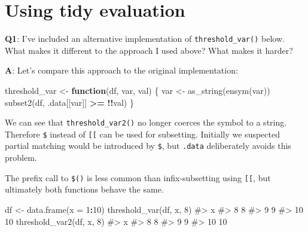 \documentclass[
]{krantz}
\makeatletter
\newenvironment{Shaded}{\begin{snugshade}}{\end{snugshade}}
\newcommand{\CommentTok}[1]{\textcolor[rgb]{0.56,0.35,0.01}{\textit{#1}}}
\newcommand{\ControlFlowTok}[1]{\textcolor[rgb]{0.13,0.29,0.53}{\textbf{#1}}}
\newcommand{\DataTypeTok}[1]{\textcolor[rgb]{0.13,0.29,0.53}{#1}}
\newcommand{\DecValTok}[1]{\textcolor[rgb]{0.00,0.00,0.81}{#1}}
\newcommand{\KeywordTok}[1]{\textcolor[rgb]{0.13,0.29,0.53}{\textbf{#1}}}
\newcommand{\NormalTok}[1]{#1}
\newcommand{\OperatorTok}[1]{\textcolor[rgb]{0.81,0.36,0.00}{\textbf{#1}}}
\newcommand{\StringTok}[1]{\textcolor[rgb]{0.31,0.60,0.02}{#1}}
\newenvironment{kframe}{%
\medskip{}
\setlength{\fboxsep}{.8em}
 \def\at@end@of@kframe{}%
 \ifinner\ifhmode%
  \def\at@end@of@kframe{\end{minipage}}%
  \begin{minipage}{\columnwidth}%
 \fi\fi%
 \def\FrameCommand##1{\hskip\@totalleftmargin \hskip-\fboxsep
 \colorbox{shadecolor}{##1}\hskip-\fboxsep
     \hskip-\linewidth \hskip-\@totalleftmargin \hskip\columnwidth}%
 \MakeFramed {\advance\hsize-\width
   \@totalleftmargin\z@ \linewidth\hsize
   \@setminipage}}%
 {\par\unskip\endMakeFramed%
 \at@end@of@kframe}
\renewenvironment{Shaded}{\begin{kframe}}{\end{kframe}}
\renewcommand{\KeywordTok} [1]{\textcolor[rgb]{0.00,0.44,0.13}{{#1}}}
\renewcommand{\DataTypeTok}[1]{\textcolor[rgb]{0.56,0.13,0.00}{{#1}}}
\renewcommand{\DecValTok}  [1]{\textcolor[rgb]{0.25,0.63,0.44}{{#1}}}
\renewcommand{\StringTok}  [1]{\textcolor[rgb]{0.25,0.44,0.63}{{#1}}}
\renewcommand{\CommentTok} [1]{\textcolor[rgb]{0.38,0.63,0.69}{{#1}}}
\renewcommand{\NormalTok}  [1]{{#1}}
\makeatother
\begin{document}
\hypertarget{using-tidy-evaluation}{%
\section{Using tidy evaluation}\label{using-tidy-evaluation}}

\textbf{{Q1}}: I've included an alternative implementation of \texttt{threshold\_var()} below. What makes it different to the approach I used above? What makes it harder?

\begin{Shaded}
\end{Shaded}

\textbf{{A}}: Let's compare this approach to the original implementation:

\begin{Shaded}
\begin{Highlighting}[]
\NormalTok{threshold_var <-}\StringTok{ }\ControlFlowTok{function}\NormalTok{(df, var, val) \{}
\NormalTok{  var <-}\StringTok{ }\KeywordTok{as_string}\NormalTok{(}\KeywordTok{ensym}\NormalTok{(var))}
  \KeywordTok{subset2}\NormalTok{(df, .data[[var]] }\OperatorTok{>=}\StringTok{ }\OperatorTok{!!}\NormalTok{val)}
\NormalTok{\}}
\end{Highlighting}
\end{Shaded}

We can see that \texttt{threshold\_var2()} no longer coerces the symbol to a string. Therefore \texttt{\$} instead of \texttt{{[}{[}} can be used for subsetting. Initially we suspected partial matching would be introduced by \texttt{\$}, but \texttt{.data} deliberately avoids this problem.

The prefix call to \texttt{\$()} is less common than infix-subsetting using \texttt{{[}{[}}, but ultimately both functions behave the same.

\begin{Shaded}
\begin{Highlighting}[]
\NormalTok{df <-}\StringTok{ }\KeywordTok{data.frame}\NormalTok{(}\DataTypeTok{x =} \DecValTok{1}\OperatorTok{:}\DecValTok{10}\NormalTok{)}
\KeywordTok{threshold_var}\NormalTok{(df, x, }\DecValTok{8}\NormalTok{)}
\CommentTok{#>     x}
\CommentTok{#> 8   8}
\CommentTok{#> 9   9}
\CommentTok{#> 10 10}
\KeywordTok{threshold_var2}\NormalTok{(df, x, }\DecValTok{8}\NormalTok{)}
\CommentTok{#>     x}
\CommentTok{#> 8   8}
\CommentTok{#> 9   9}
\CommentTok{#> 10 10}
\end{Highlighting}
\end{Shaded}
\end{document}
